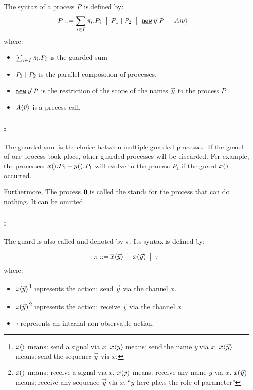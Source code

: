 \begin{definition}
\label{def_process_syntax}
The syntax of a \picalc{} process \textit{P} is defined by: 
\begin{align*}
 P & \syntdef \procsum \ebnf \procpar{P_1}{P_2} \ebnf \procres{\vec{y}}{P} \ebnf \proccall{A}{\vec{v}}
\end{align*}
where:
\begin{itemize}
\item $\sum_{i\in I}{\pi_i.P_i}$ is the guarded sum.
\item $P_1 \mid P_2$ is the parallel composition of processes.
\item $\procres{\vec{y}}{P}$ is the restriction of the scope of the names $\vec{y}$ to the process $P$
\item $A\langle\vec{v}\rangle$ is a process call. 
\end{itemize}
\end{definition}

\subsubsection{:} The guarded sum is the choice between multiple guarded processes. If the guard of one process took place, other guarded processes will be discarded. For example, the processes: $x().P_1 + y().P_2$ will evolve to the process $P_1$ if the guard $x()$ occurred.

Furthermore, The process $\mathbf{0}$ is called the  stands for the process that can do nothing. It can be omitted.
\subsubsection{:} The guard is also called  and denoted by $\pi$. Its syntax is defined by:
\begin{definition}
\label{def_prefix_syntax}
\begin{align*}
 \pi ::= \overline{x}\langle\vec{y}\rangle \;\bigm|\; x(\vec{y}) \;\bigm|\; \tau
\end{align*}
where:
\begin{itemize}
\item $\overline{x}\langle\vec{y}\rangle$\footnote{$\overline{x}\langle{}\rangle$ means: send a signal via $x$. $\overline{x}\langle{y}\rangle$ means: send the name $y$ via $x$.  $\overline{x}\langle{\vec{y}}\rangle$ means: send the sequence $\vec{y}$ via $x$.} represents the action: send $\vec{y}$ via the channel $x$.
\item $x(\vec{y})$\footnote{$x({})$ means: receive a signal via $x$. $x({y})$ means: receive any name $y$ via $x$.  $x({\vec{y}})$ means: receive any sequence $\vec{y}$ via $x$. ``$y$ here plays the role of parameter''} represents the action: receive $\vec{y}$ via the channel $x$.
\item $\tau$ represents an internal non-observable action.
\end{itemize}
\end{definition}

